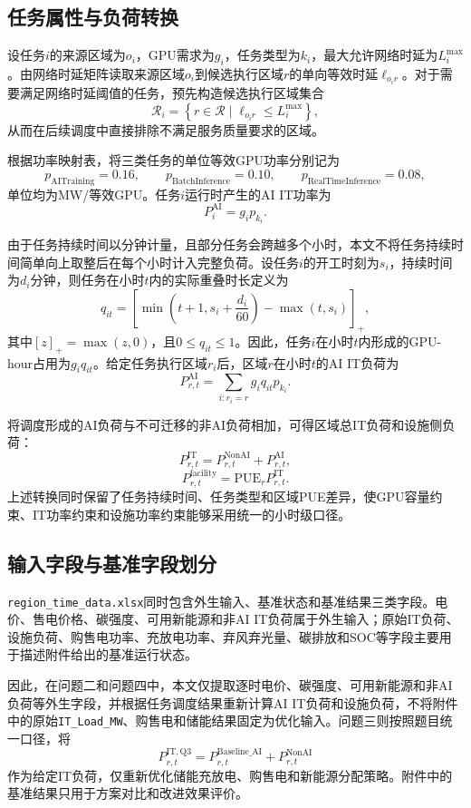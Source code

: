 \documentclass[UTF8,a4paper,zihao=-4]{ctexart}
\begin{document}
\subsection{任务属性与负荷转换}

设任务$i$的来源区域为$o_i$，GPU需求为$g_i$，任务类型为$k_i$，最大允许网络时延为$L_i^{\max}$。由网络时延矩阵读取来源区域$o_i$到候选执行区域$r$的单向等效时延$\ell_{o_i r}$。对于需要满足网络时延阈值的任务，预先构造候选执行区域集合
\[
\mathcal{R}_i
=
\left\{
r\in\mathcal{R}\mid
\ell_{o_i r}\leq L_i^{\max}
\right\},
\]
从而在后续调度中直接排除不满足服务质量要求的区域。

根据功率映射表，将三类任务的单位等效GPU功率分别记为
\[
p_{\mathrm{AITraining}}=0.16,\qquad
p_{\mathrm{BatchInference}}=0.10,\qquad
p_{\mathrm{RealTimeInference}}=0.08,
\]
单位均为MW/等效GPU。任务$i$运行时产生的AI IT功率为
\[
P_i^{\mathrm{AI}}=g_i p_{k_i}.
\]

由于任务持续时间以分钟计量，且部分任务会跨越多个小时，本文不将任务持续时间简单向上取整后在每个小时计入完整负荷。设任务$i$的开工时刻为$s_i$，持续时间为$d_i$分钟，则任务在小时$t$内的实际重叠时长定义为
\[
q_{it}
=
\left[
\min\left(t+1,s_i+\frac{d_i}{60}\right)
-
\max(t,s_i)
\right]_{+},
\]
其中$[z]_{+}=\max(z,0)$，且$0\leq q_{it}\leq1$。因此，任务$i$在小时$t$内形成的GPU-hour占用为$g_iq_{it}$。给定任务执行区域$r_i$后，区域$r$在小时$t$的AI IT负荷为
\[
P_{r,t}^{\mathrm{AI}}
=
\sum_{i:r_i=r}
g_iq_{it}p_{k_i}.
\]

将调度形成的AI负荷与不可迁移的非AI负荷相加，可得区域总IT负荷和设施侧负荷：
\[
P_{r,t}^{\mathrm{IT}}
=
P_{r,t}^{\mathrm{NonAI}}
+
P_{r,t}^{\mathrm{AI}},
\]
\[
P_{r,t}^{\mathrm{facility}}
=
\mathrm{PUE}_{r}P_{r,t}^{\mathrm{IT}}.
\]
上述转换同时保留了任务持续时间、任务类型和区域PUE差异，使GPU容量约束、IT功率约束和设施功率约束能够采用统一的小时级口径。

\subsection{输入字段与基准字段划分}

\texttt{region\_time\_data.xlsx}同时包含外生输入、基准状态和基准结果三类字段。电价、售电价格、碳强度、可用新能源和非AI IT负荷属于外生输入；原始IT负荷、设施负荷、购售电功率、充放电功率、弃风弃光量、碳排放和SOC等字段主要用于描述附件给出的基准运行状态。

因此，在问题二和问题四中，本文仅提取逐时电价、碳强度、可用新能源和非AI负荷等外生字段，并根据任务调度结果重新计算AI IT负荷和设施负荷，不将附件中的原始\texttt{IT\_Load\_MW}、购售电和储能结果固定为优化输入。问题三则按照题目统一口径，将
\[
P_{r,t}^{\mathrm{IT,Q3}}
=
P_{r,t}^{\mathrm{Baseline\_AI}}
+
P_{r,t}^{\mathrm{NonAI}}
\]
作为给定IT负荷，仅重新优化储能充放电、购售电和新能源分配策略。附件中的基准结果只用于方案对比和改进效果评价。
\end{document}
